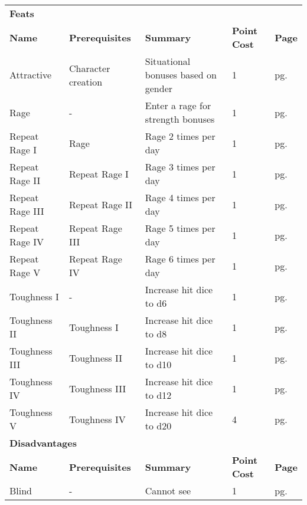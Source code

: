 \begin{multicols*}{2}
    \begin{table*}[ht]
        \unclassedrowcolors
        \begin{tabularx}{\textwidth}{l X X l l}
            \multicolumn{5}{l}{\textbf{Feats}} \\
            \textbf{Name} & \textbf{Prerequisites} & \textbf{Summary} & \textbf{Point Cost} & \textbf{Page} \\
            Attractive & Character creation & Situational bonuses based on gender & 1 & pg. \pageref{feat:attractive} \\
            Rage & - & Enter a rage for strength bonuses & 1 & pg. \pageref{feat:rage} \\
            \quad Repeat Rage I & Rage & Rage 2 times per day & 1 & pg. \pageref{feat:repeatrage1} \\
            \quad Repeat Rage II & Repeat Rage I & Rage 3 times per day & 1 & pg. \pageref{feat:repeatrage2} \\
            \quad Repeat Rage III & Repeat Rage II & Rage 4 times per day & 1 & pg. \pageref{feat:repeatrage3} \\
            \quad Repeat Rage IV & Repeat Rage III & Rage 5 times per day & 1 & pg. \pageref{feat:repeatrage4} \\
            \quad Repeat Rage V & Repeat Rage IV & Rage 6 times per day & 1 & pg. \pageref{feat:repeatrage5} \\
            Toughness I & - & Increase hit dice to d6 & 1 & pg. \pageref{feat:toughness1} \\
            \quad Toughness II & Toughness I & Increase hit dice to d8 & 1 & pg. \pageref{feat:toughness2} \\
            \quad Toughness III & Toughness II & Increase hit dice to d10 & 1 & pg. \pageref{feat:toughness3} \\
            \quad Toughness IV & Toughness III & Increase hit dice to d12 & 1 & pg. \pageref{feat:toughness4} \\
            \quad Toughness V & Toughness IV & Increase hit dice to d20 & 4 & pg. \pageref{feat:toughness5} \\
            \multicolumn{5}{l}{\textbf{Disadvantages}} \\
            \textbf{Name} & \textbf{Prerequisites} & \textbf{Summary} & \textbf{Point Cost} & \textbf{Page} \\
            Blind & - & Cannot see & 1 & pg. \pageref{flaw:blind} \\

\end{tabularx}
\end{table*}
\end{multicols*}
